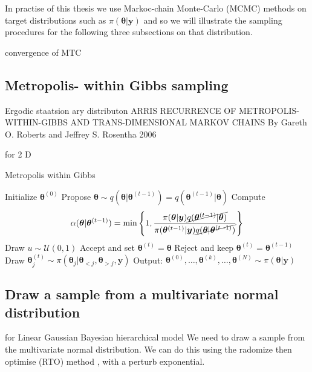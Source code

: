 In practise of this thesis we use Markoc-chain Monte-Carlo (MCMC) methods on target distributions such as $\pi(\bm{\theta}| \bm{y})$ and so we will illustrate the sampling procedures for the following three subsections on that distribution.


convergence of 
MTC

\subsection{Metropolis- within Gibbs sampling}
Ergodic staatsion ary distributon 
\cite{}
ARRIS RECURRENCE OF METROPOLIS-WITHIN-GIBBS AND
TRANS-DIMENSIONAL MARKOV CHAINS
By Gareth O. Roberts and Jeffrey S. Rosentha 2006


for 2 D


\begin{algorithm}
	\caption{Metropolis within Gibbs}
	\begin{algorithmic}[1]
		\STATE Initialize \( \bm{\theta}^{(0)} \)
		\STATE Propose \( \bm{\theta} \sim q(\bm{\theta} | \bm{\theta}^{(t-1)}) = q(\bm{\theta}^{(t-1)} | \bm{\theta}) \)
		\STATE Compute
		\[ \alpha(\bm{\theta} | \bm{\theta}^{(t-1)}) = \min \left\{ 1, \frac{\pi(\bm{\theta}  | \bm{y}) \cancel{q(\bm{\theta}^{(t-1)} | \bm{\theta}) } }{\pi(\bm{\theta}^{(t-1)}| \bm{y}) \cancel{q(\bm{\theta} | \bm{\theta}^{(t-1)})} } \right\} \]
		\STATE Draw $u \sim \mathcal{U}(0,1)$
		\STATE Accept and set \( \bm{\theta}^{(t)} = \bm{\theta} \)
		\ELSE  
		\STATE Reject and keep \(\bm{\theta}^{(t)} = \bm{\theta}^{(t-1)} \)
		\ENDIF
		\STATE Draw \(\bm{\theta}_j^{(t)} \sim  \pi(\bm{\theta}_j | \bm{\theta}_{<j}, \bm{\theta}_{>j} , \bm{y} )\) 
		\ENDFOR
		\STATE Output: $ \bm{\theta}^{(0)}, \dots,  \bm{\theta}^{(k)} , \dots,   \bm{\theta}^{(N)} \sim \pi(\bm{\theta}| \bm{y}) $
	\end{algorithmic}
\end{algorithm}


\subsection{Draw a sample from a multivariate normal distribution}
for Linear Gaussian Bayesian hierarchical model We need to draw a sample from the multivariate normal distribution.
We can do this using the radomize then optimise (RTO) method \cite{}, with a perturb exponential.

